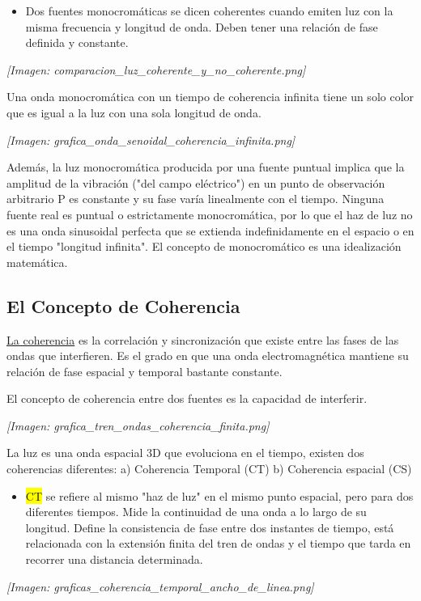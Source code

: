 \documentclass[12pt]{article}
\begin{document}
	\begin{itemize}
		\item Dos fuentes monocromáticas se dicen coherentes cuando emiten luz con la misma frecuencia y longitud de onda. Deben tener una relación de fase definida y constante.
	\end{itemize}
	
	\textit{[Imagen: comparacion\_luz\_coherente\_y\_no\_coherente.png]}
	
	Una onda monocromática con un tiempo de coherencia infinita tiene un solo color que es igual a la luz con una sola longitud de onda.
	
	\textit{[Imagen: grafica\_onda\_senoidal\_coherencia\_infinita.png]}
	
	Además, la luz monocromática producida por una fuente puntual implica que la amplitud de la vibración ("del campo eléctrico") en un punto de observación arbitrario P es constante y su fase varía linealmente con el tiempo.
	Ninguna fuente real es puntual o estrictamente monocromática, por lo que el haz de luz no es una onda sinusoidal perfecta que se extienda indefinidamente en el espacio o en el tiempo "longitud infinita". El concepto de monocromático es una idealización matemática.
	
	\subsection{El Concepto de Coherencia}
	\underline{La coherencia} es la correlación y sincronización que existe entre las fases de las ondas que interfieren. Es el grado en que una onda electromagnética mantiene su relación de fase espacial y temporal bastante constante.
	
	El concepto de coherencia entre dos fuentes es la capacidad de interferir.
	
	\textit{[Imagen: grafica\_tren\_ondas\_coherencia\_finita.png]}
	
	La luz es una onda espacial 3D que evoluciona en el tiempo, existen dos coherencias diferentes: a) Coherencia Temporal (CT) b) Coherencia espacial (CS)
	
	\begin{itemize}
		\item \colorbox{yellow}{CT} se refiere al mismo "haz de luz" en el mismo punto espacial, pero para dos diferentes tiempos. Mide la continuidad de una onda a lo largo de su longitud. Define la consistencia de fase entre dos instantes de tiempo, está relacionada con la extensión finita del tren de ondas y el tiempo que tarda en recorrer una distancia determinada.
	\end{itemize}
	\textit{[Imagen: graficas\_coherencia\_temporal\_ancho\_de\_linea.png]}
	
\end{document}
